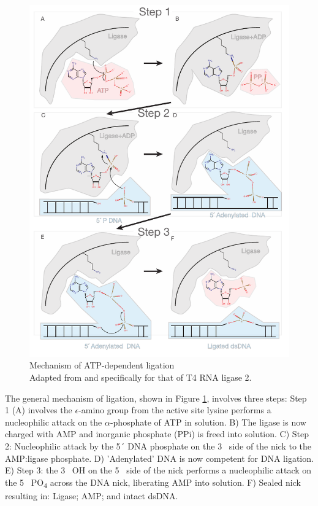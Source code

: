 \begin{figure}[htbp]
	\centering 
	\includegraphics{Figures/LigationMechanism.pdf}
	\caption[Mechanism of Rnl2 ATP-dependent ligation]
	{
		Mechanism of ATP-dependent ligation\\[0.25cm]
		Adapted from \citep{Nandakumar2006} and specifically for that of T4 RNA ligase 2.
	}
	\label{fig:Ligation Mechanism}
\end{figure}

The general mechanism of ligation, shown in Figure \ref{fig:Ligation Mechanism}, involves three steps: Step 1 (A) involves the $\epsilon$-amino group from the active site lysine performs a nucleophilic attack on the $\alpha$-phosphate of ATP in solution.  B) The ligase is now charged with AMP and inorganic phosphate (PPi) is freed into solution. C) Step 2: Nucleophilic attack by the 5´ DNA phosphate on the 3\textprime~ side of the nick to the AMP:ligase phosphate. D) 'Adenylated' DNA is now competent for DNA ligation. E) Step 3: the 3\textprime~ OH on the 5\textprime~ side of the nick performs a nucleophilic attack on the 5\textprime~ PO\textsubscript{4} across the DNA nick, liberating AMP into solution. F) Sealed nick resulting in: Ligase; AMP; and intact dsDNA.

